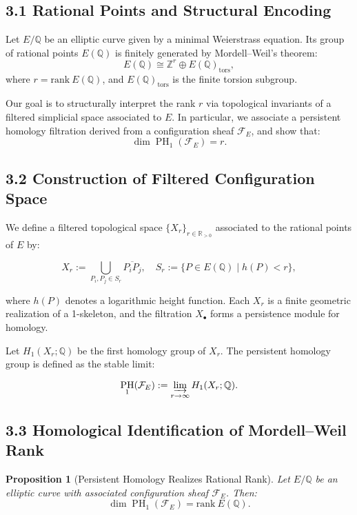 \documentclass[11pt]{article}
\newtheorem{proposition}[theorem]{Proposition}
\DeclareMathOperator{\PH}{PH}
\begin{document}
\subsection*{3.1 Rational Points and Structural Encoding}

Let \( E/\mathbb{Q} \) be an elliptic curve given by a minimal Weierstrass equation. Its group of rational points \( E(\mathbb{Q}) \) is finitely generated by Mordell–Weil’s theorem:
\[
E(\mathbb{Q}) \cong \mathbb{Z}^r \oplus E(\mathbb{Q})_{\mathrm{tors}},
\]
where \( r = \mathrm{rank}~E(\mathbb{Q}) \), and \( E(\mathbb{Q})_{\mathrm{tors}} \) is the finite torsion subgroup.

Our goal is to structurally interpret the rank \( r \) via topological invariants of a filtered simplicial space associated to \( E \). In particular, we associate a persistent homology filtration derived from a configuration sheaf \( \mathcal{F}_E \), and show that:
\[
\dim \PH_1(\mathcal{F}_E) = r.
\]

\subsection*{3.2 Construction of Filtered Configuration Space}

We define a filtered topological space \( \{ X_r \}_{r \in \mathbb{R}_{>0}} \) associated to the rational points of \( E \) by:

\[
X_r := \bigcup_{P_i, P_j \in S_r} \overline{P_iP_j}, \quad
S_r := \{ P \in E(\mathbb{Q}) \mid h(P) < r \},
\]

where \( h(P) \) denotes a logarithmic height function. Each \( X_r \) is a finite geometric realization of a 1-skeleton, and the filtration \( X_\bullet \) forms a persistence module for homology.

Let \( H_1(X_r; \mathbb{Q}) \) be the first homology group of \( X_r \). The persistent homology group is defined as the stable limit:

\[
\PH_1(\mathcal{F}_E) := \varinjlim_{r \to \infty} H_1(X_r; \mathbb{Q}).
\]

\subsection*{3.3 Homological Identification of Mordell–Weil Rank}

\begin{proposition}[Persistent Homology Realizes Rational Rank]
\label{prop:ph1-equals-rank}
Let \( E/\mathbb{Q} \) be an elliptic curve with associated configuration sheaf \( \mathcal{F}_E \). Then:
\[
\dim \PH_1(\mathcal{F}_E) = \mathrm{rank}~E(\mathbb{Q}).
\]
\end{proposition}
\end{document}
